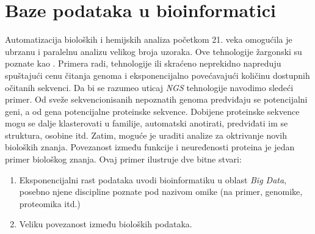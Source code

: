 \chapter{Baze podataka u bioinformatici} %

\label{Baze} %

Automatizacija bioloških i hemijskih analiza početkom 21. veka omogućila je
ubrzanu i paralelnu analizu velikog broja uzoraka. Ove tehnologije žargonski su
poznate kao  . Primera radi, tehnologije 
 ili skraćeno  neprekidno napreduju
spuštajući cenu čitanja genoma i eksponencijalno povećavajući količinu dostupnih
očitanih sekvenci. Da bi se razumeo uticaj \textit{NGS} tehnologije navodimo sledeći
primer.  Od sveže sekvencionisanih nepoznatih genoma predviđaju se potencijalni
geni, a od gena potencijalne proteinske sekvence.  Dobijene proteinske sekvence
mogu se dalje klasterovati u familije, automatski anotirati, predviđati im se
struktura, osobine itd.  Zatim, moguće je uraditi analize za oktrivanje novih
bioloških znanja. Povezanost između funkcije i neuređenosti proteina je jedan
primer biološkog znanja.  Ovaj primer ilustruje dve bitne stvari:
\begin{enumerate}
  \item Eksponencijalni rast podataka uvodi bioinformatiku u oblast \textit{Big Data},
    posebno njene discipline poznate pod nazivom omike (na primer, genomike, proteomika itd.)
  \item Veliku povezanost između bioloških podataka.
\end{enumerate}

